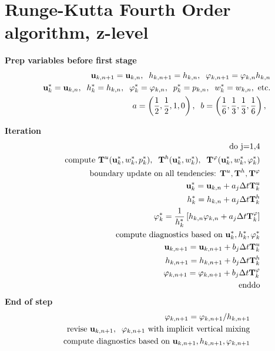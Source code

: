 \documentclass[11pt]{report}
\begin{document}
\newpage
\section{Runge-Kutta Fourth Order algorithm, z-level}
{\bf Prep variables before first stage}
\begin{eqnarray} &&
{\bf u}_{k,n+1}={\bf u}_{k,n}, \;\;
h_{k,n+1}=h_{k,n},\;\;
{\varphi}_{k,n+1} = {\varphi}_{k,n} h_{k,n}
\\&&
{\bf u}_k^*={\bf u}_{k,n}, \;\;
h_k^*=h_{k,n},\;\;
{\varphi}_k^* = {\varphi}_{k,n}, \;\;
p_k^*=p_{k,n},\;\;
w_k^*=w_{k,n},\mbox{ etc.}
\\&&
a = \left(\frac{1}{2},\frac{1}{2},1,0 \right),\;\;
b = \left(\frac{1}{6},\frac{1}{3},\frac{1}{3},\frac{1}{6}\right),\;\;
\end{eqnarray}

{\bf Iteration}
\begin{eqnarray} &&
\mbox{do j=1,4} \\&& \hspace{.5cm}
\mbox{compute } {\bf T}^u({\bf u}_k^*,w_k^*,p_k^*), \;\;
{\bf T}^h({\bf u}_k^*,w_k^*), \;\;
{\bf T}^\varphi({\bf u}_k^*,w_k^*,\varphi_k^*) \\ && \hspace{.5cm}
\mbox{boundary update on all tendencies: } {\bf T}^u,{\bf T}^h,{\bf T}^\varphi\\&& \hspace{.5cm}
{\bf u}^*_k = {\bf u}_{k,n} + a_j \Delta t {\bf T}^u_k \\&& \hspace{.5cm}
h^*_k = h_{k,n} + a_j \Delta t {\bf T}^h_k \\&& \hspace{.5cm}
{\varphi}_k^* = \frac{1}{h_k^*} \left[
h_{k,n} \varphi_{k,n} 
+ a_j \Delta t  {\bf T}^\varphi_k \right]
\\&& \hspace{.5cm}
\mbox{compute diagnostics based on }{\bf u}_k^*,h_k^*,\varphi_k^* \\&& \hspace{.5cm}
{\bf u}_{k,n+1} = {\bf u}_{k,n+1} + b_j \Delta t {\bf T}^u_k \\&& \hspace{.5cm}
h_{k,n+1} = h_{k,n+1} + b_j \Delta t {\bf T}^h_k \\&& \hspace{.5cm}
{\varphi}_{k,n+1} = 
 \varphi_{k,n+1} 
+ b_j \Delta t  {\bf T}^\varphi_k \\&&
\mbox{enddo}
\end{eqnarray}
{\bf End of step}
\begin{eqnarray} &&
\varphi_{k,n+1} = 
 \varphi_{k,n+1} / h_{k,n+1} \\&&
\mbox{revise } {\bf u}_{k,n+1},\;\;\varphi_{k,n+1} \mbox{ with implicit vertical mixing}\\&&
\mbox{compute diagnostics based on }{\bf u}_{k,n+1},h_{k,n+1},\varphi_{k,n+1} 
\end{eqnarray}
\end{document}
